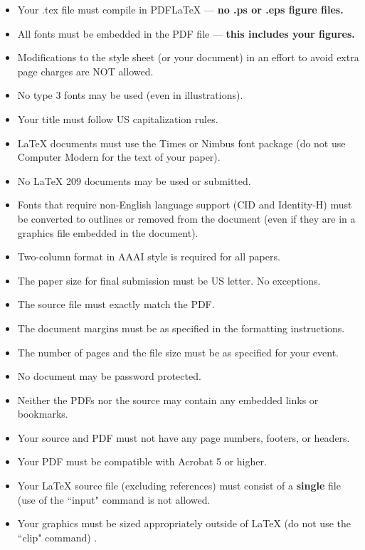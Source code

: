 \documentclass[letterpaper]{article}
\begin{document}
	\begin{itemize}
		\item Your .tex file must compile in PDF\LaTeX{} --- \textbf{ no .ps or .eps figure files.}
		\item All fonts must be embedded in the PDF file --- \textbf{ this includes your figures.}
		\item Modifications to the style sheet (or your document) in an effort to avoid extra page charges are NOT allowed.
		\item No type 3 fonts may be used (even in illustrations).
		\item Your title must follow US capitalization rules.
		\item \LaTeX{} documents must use the Times or Nimbus font package (do not use Computer Modern for the text of your paper).
		\item No \LaTeX{} 209 documents may be used or submitted.
		\item Fonts that require non-English language support (CID and Identity-H) must be converted to outlines or removed from the document (even if they are in a graphics file embedded in the document). 
		\item Two-column format in AAAI style is required for all papers.
		\item The paper size for final submission must be US letter. No exceptions.
		\item The source file must exactly match the PDF.
		\item The document margins must be as specified in the formatting instructions.
		\item The number of pages and the file size must be as specified for your event.
		\item No document may be password protected.
		\item Neither the PDFs nor the source may contain any embedded links or bookmarks.
		\item Your source and PDF must not have any page numbers, footers, or headers.
		\item Your PDF must be compatible with Acrobat 5 or higher.
		\item Your \LaTeX{} source file (excluding references) must consist of a \textbf{single} file (use of the ``input" command is not allowed.
		\item Your graphics must be sized appropriately outside of \LaTeX{} (do not use the ``clip" command) .
	\end{itemize}
	
\end{document}
